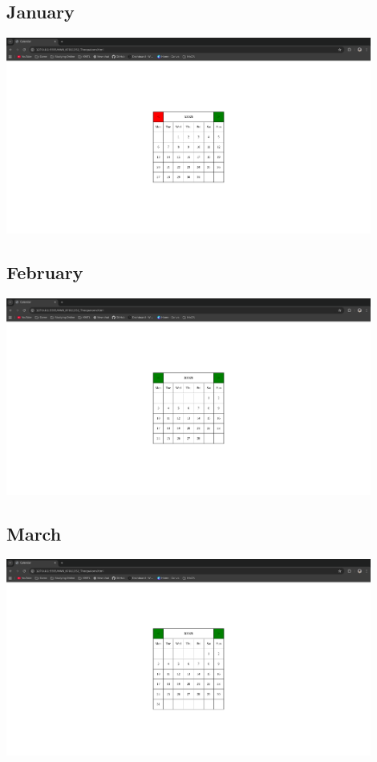 \documentclass[12pt]{report} %
\begin{document}
\subsection*{January}
\includegraphics[width=12cm]{./images/Output01.png} \\
\subsection*{February}
\includegraphics[width=12cm]{./images/Output02.png} \\
\subsection*{March}
\includegraphics[width=12cm]{./images/Output03.png} \\
\end{document}
